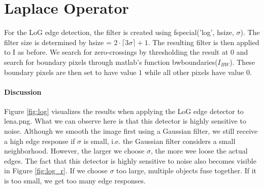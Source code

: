 \documentclass{article}
\begin{document}
\section{Laplace Operator}
For the LoG edge detection, the filter is created using \textsf{fspecial('log', hsize, $\sigma$)}. The filter size is determined by \textsf{hsize} = $2 \cdot \lceil 3 \sigma \rceil + 1$. The resulting filter is then applied to \textsf{I} as before. We search for zero-crossings by thresholding the result at $0$ and search for boundary pixels through matlab's function \textsf{bwboundaries($I_{BW}$)}. These boundary pixels are then set to have value $1$ while all other pixels have value $0$.

\paragraph{Discussion} 
Figure \ref{fig:log} visualizes the results when applying the LoG edge detector to \textsf{lena.png}. What we can observe here is that this detector is highly sensitive to noise. Although we smooth the image first using a Gaussian filter, we still receive a high edge response if $\sigma$ is small, i.e. the Gaussian filter considers a small neighborhood. However, the larger we choose $\sigma$, the more wee loose the actual edges. The fact that this detector is highly sensitive to noise also becomes visible in Figure \ref{fig:log_r}. If we choose $\sigma$ too large, multiple objects fuse together. If it is too small, we get too many edge responses.
\end{document}
